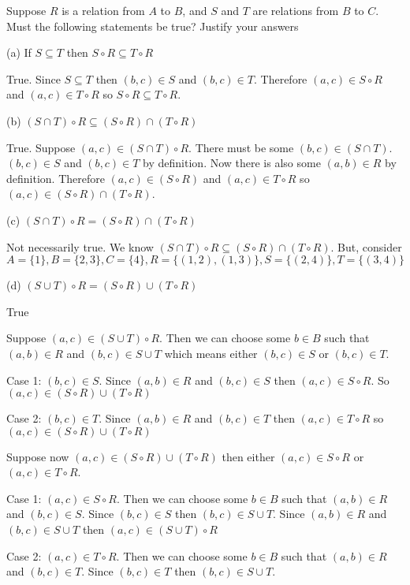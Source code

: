 \documentclass[11pt]{article}
\begin{document}
Suppose $R$ is a relation from $A$ to $B$, and $S$ and $T$ are relations from 
$B$ to $C$. Must the following statements be true? Justify your answers

\noindent (a) If $S \subseteq T$ then $S \circ R \subseteq T \circ R$

True. Since $S \subseteq T$ then $(b,c) \in S$ and $(b,c) \in T$. Therefore 
$(a,c) \in S \circ R$ and $(a,c) \in T \circ R$ so $S \circ R \subseteq T \circ R$.

\noindent (b) $(S \cap T) \circ R \subseteq (S \circ R) \cap (T \circ R)$

True. Suppose $(a,c) \in (S \cap T) \circ R$. There must be some 
$(b,c) \in (S \cap T)$. $(b,c) \in S$ and $(b,c) \in T$ by definition. Now there 
is also some $(a,b) \in R$ by definition. Therefore $(a,c) \in (S \circ R)$ and 
$(a,c) \in T \circ R$ so $(a,c) \in (S \circ R) \cap (T \circ R)$.

\noindent (c) $(S \cap T) \circ R = (S \circ R) \cap (T \circ R)$

Not necessarily true. We know $(S \cap T) \circ R \subseteq (S \circ R) \cap (T \circ R)$.
But, consider $A=\{1\}, B=\{2,3\}, C=\{4\}, R=\{(1,2), (1,3)\}, S=\{(2,4)\},
T=\{(3,4)\}$

\noindent (d) $(S \cup T) \circ R = (S \circ R) \cup (T \circ R)$

True

Suppose $(a,c) \in (S \cup T) \circ R$. Then we can choose some $b \in B$ such 
that $(a,b) \in R$ and $(b,c) \in S \cup T$ which means either $(b,c) \in S$
or $(b,c) \in T$.

Case 1: $(b,c) \in S$. Since $(a,b) \in R$ and $(b,c) \in S$ then 
$(a,c) \in S \circ R$. So $(a,c) \in (S \circ R) \cup (T \circ R)$

Case 2: $(b,c) \in T$. Since $(a,b) \in R$ and $(b,c) \in T$ then $(a,c) \in T \circ R$
so $(a,c) \in (S \circ R) \cup (T \circ R)$

Suppose now $(a,c) \in (S \circ R) \cup (T \circ R)$ then either 
$(a,c) \in S \circ R$ or $(a,c) \in T \circ R$. 

Case 1: $(a,c) \in S \circ R$. Then we can choose some $b \in B$ such that 
$(a,b) \in R$ and $(b,c) \in S$. Since $(b,c) \in S$ then $(b,c) \in S \cup T$. 
Since $(a,b) \in R$ and $(b,c) \in S \cup T$ then $(a,c) \in (S \cup T) \circ R$

Case 2: $(a,c) \in T \circ R$. Then we can choose some $b \in B$ such that 
$(a,b) \in R$ and $(b,c) \in T$. Since $(b,c) \in T$ then 
$(b,c) \in S \cup T$.
\end{document}
